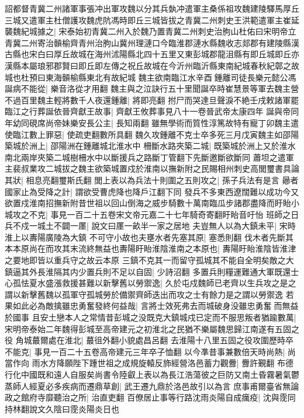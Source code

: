 詔都督青冀二州諸軍事張冲出軍攻魏以分其兵埶冲遣軍主桑係祖攻魏建陵驛馬厚丘三城又遣軍主杜僧護攻魏虎阬馮時即丘三城皆拔之青冀二州刺史王洪範遣軍主崔延襲魏紀城據之|{
	宋泰始初青冀二州入於魏乃置青冀二州刺史治朐山杜佑曰宋明帝立青冀二州寄治贑榆齊青州治朐山冀州理漣口今臨淮郡漣水縣魏收志郯郡有建陵縣漢古縣也宋白曰厚丘故城在海州沭陽縣北四十五里又東彭城郡龍沮縣有即丘城即丘亦漢縣本屬琅邪郡賢曰即丘即左傳之祝丘故城在今沂州臨沂縣東南紀城春秋紀鄣之故城也杜預曰東海贑榆縣東北有故紀城}
魏主欲南臨江水辛酉鍾離司徒長樂元懿公馮誕病不能從|{
	樂音洛從才用翻}
魏主與之泣訣行五十里聞誕卒時崔慧景等軍去魏主營不過百里魏主輕將數千人夜還鍾離|{
	將即亮翻}
拊尸而哭達旦聲淚不絶壬戌敕諸軍罷臨江之行葬誕依晉齊獻王故事|{
	齊獻王攸葬事見八十一卷晉武帝太康四年}
誕與帝同年幼同硯席尚帝妹樂安長公主|{
	長知兩翻}
雖無學術而質性淳篤故特有寵丁卯魏主遣使臨江數上罪惡|{
	使疏吏翻數所具翻}
魏久攻鍾離不克士卒多死三月戊寅魏主如邵陽築城於洲上|{
	邵陽洲在鍾離城北淮水中}
柵斷水路夾築二城|{
	既築城於洲上又於淮水南北兩岸夾築二城樹柵水中以斷援兵之路斷丁管翻下先斷邀斷欲斷同}
蕭坦之遣軍主裴叔業攻二城拔之魏主欲築城置戍於淮南以撫新附之民賜相州刺史高閭璽書具論其狀|{
	相息亮翻璽斯氏翻}
閭上表以為兵法十則圍之五則攻之|{
	孫子兵法有是言}
曏者國家止為受降之計|{
	謂欲受曹虎降也降戶江翻下同}
發兵不多東西遼闊難以成功今又欲置戍淮南招撫新附昔世祖以回山倒海之威步騎數十萬南臨瓜步諸郡盡降而盱眙小城攻之不克|{
	事見一百二十五卷宋文帝元嘉二十七年騎奇寄翻盱眙音吁怡}
班師之日兵不戍一城土不闢一㕓|{
	說文曰㕓一畝半一家之居地}
夫豈無人以為大鎮未平|{
	宋時淮上以夀陽廣陵為大鎮}
不可守小故也夫壅水者先塞其原|{
	塞悉則翻}
伐木者先斷其本本原尚在而攻其末流終無益也夀陽盱眙淮陰淮南之本原也|{
	夀陽盱眙淮陰皆淮津之要地即皆以重兵守之故云本原}
三鎮不克其一而留守孤城其不能自全明矣敵之大鎮逼其外長淮隔其内少置兵則不足以自固|{
	少詩沼翻}
多置兵則糧運難通大軍既還士心孤怯夏水盛漲救援甚難以新擊舊以勞禦逸|{
	久於屯戍魏師已老齊以生兵攻之是之謂以新擊舊魏以孤軍守孤城勞於備禦齊師迭出而攻之士有餘力是之謂以勞禦逸}
若果如此必為敵擒雖忠勇奮發終何益哉|{
	言將士效死弗去而城破身没雖忠勇奮而無益於國事}
且安土戀本人之常情昔彭城之没既克大鎮城戍已定而不服思叛者猶踰數萬|{
	宋明帝泰始二年魏得彭城至高帝建元之初淮北之民猶不樂屬魏思歸江南遂有五固之役}
角城蕞爾處在淮北|{
	蕞徂外翻小貌處昌呂翻}
去淮陽十八里五固之役攻圍歷時卒不能克|{
	事見一百二十五卷高帝建元三年卒子恤翻}
以今凖昔事兼數倍天時尚熱|{
	尚當作向}
雨水方降願陛下踵世祖之成規旋轅反斾經營洛邑蓄力觀釁|{
	釁許覲翻}
布德行化中國既和遠人自服矣尚書令陸叡上表以為長江浩蕩彼之巨防又南土昏霧暑氣鬱蒸師人經夏必多疾病而遷鼎草創|{
	武王遷九鼎於洛邑故引以為言}
庶事甫爾臺省無論政之館府寺靡聽治之所|{
	治直吏翻}
百僚居止事等行路沈雨炎陽自成癘疫|{
	沈與霃同持林翻說文久陰曰霃炎陽炎日也}
